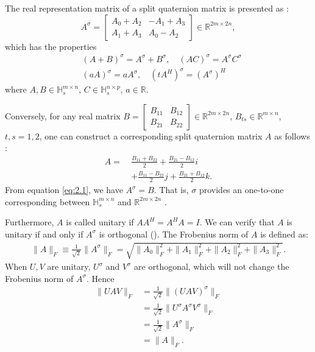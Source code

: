 \documentclass[5p]{elsarticle}
\numberwithin{equation}{section}
\begin{document}
The real representation matrix of a split quaternion matrix is presented as \cite{Gang2024}:
\begin{equation}\label{eq:2.1}
{A}^\sigma = \begin{bmatrix} A_0 + A_2 & -A_1 + A_3 \\ A_1 + A_3 & A_0 - A_2 \end{bmatrix} \in \mathbb{R}^{2m \times 2n},
\end{equation}
which has the properties
\begin{equation}\label{eq:2.2}
\begin{aligned}
    &(A + B)^\sigma = A^\sigma + B^\sigma, \quad (AC)^\sigma = A^\sigma C^\sigma \\
    &(a A)^\sigma = a A^\sigma, \quad (tA^H)^\sigma = (A^\sigma)^H
\end{aligned}
\end{equation}
where $A, B \in \mathbb{H}_s^{m \times n}$, $C \in \mathbb{H}_s^{n \times p}$, $a \in \mathbb{R}$. 

Conversely, for any real matrix $B = \begin{bmatrix} B_{11} & B_{12} \\ B_{21} & B_{22} \end{bmatrix} \in \mathbb{R}^{2m \times 2n}$, $B_{ts} \in \mathbb{R}^{m \times n}$, $t, s = 1, 2$, one can construct a corresponding split quaternion matrix $A$ as follows \cite{TJiang2015}:
\begin{equation}\label{eq:2.3}
    \begin{aligned}
    A =\ & \frac{B_{11} + B_{22}}{2} + \frac{B_{21} - B_{12}}{2}i \\
         & + \frac{B_{11} - B_{22}}{2}j + \frac{B_{21} + B_{12}}{2}k.
    \end{aligned}
    \end{equation}
From equation \eqref{eq:2.1}, we have ${A}^\sigma = B$. 
That is,  $\sigma$ provides an one-to-one corresponding between $\mathbb{H}_s^{m\times n}$ and $\mathbb{R}^{2m \times 2n}$ \cite{Gang2024}.

Furthermore,  $A$ is called unitary if $AA^H = A^H A = I$. We can verify that $A$ is unitary if and only if  $A^\sigma$ is  orthogonal (\cite{TJiang2018}).
 The Frobenius norm of $A$ is defined as: 
 \begin{align*}
     \| A \|_F \equiv \frac{1}{\sqrt{2}} \| A^\sigma \|_F = \sqrt{\| A_0 \|_F^2 + \| A_1 \|_F^2 + \| A_2 \|_F^2 + \| A_3 \|_F^2}.
\end{align*}
  When $U, V$ are unitary, $U^\sigma$ and $V^\sigma$ are orthogonal, which will not change the Frobenius norm  of $A^\sigma$. Hence
\begin{align*}
\|UAV\|_F &= \frac{1}{\sqrt{2}} \|(UAV)^\sigma\|_F \\
&= \frac{1}{\sqrt{2}} \|U^\sigma A^\sigma V^\sigma\|_F \\
&= \frac{1}{\sqrt{2}} \|A^\sigma\|_F \\
&= \|A\|_F.
\end{align*}
\end{document}
